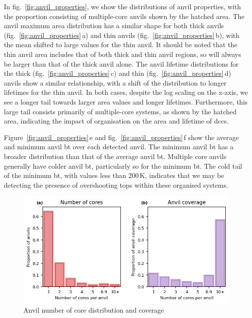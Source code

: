 In fig.~\ref{fig:anvil_properties}, we show the distributions of anvil properties, with the proportion consisting of multiple-core anvils shown by the hatched area.
The anvil maximum area distribution has a similar shape for both thick anvils (fig.~\ref{fig:anvil_properties}\,a) and thin anvils (fig.~\ref{fig:anvil_properties}\,b), with the mean shifted to large values for the thin anvil.
It should be noted that the thin anvil area includes that of both thick and thin anvil regions, so will always be larger than that of the thick anvil alone.
The anvil lifetime distributions for the thick (fig.~\ref{fig:anvil_properties}\,c) and thin (fig.~\ref{fig:anvil_properties}\,d) anvils show a similar relationship, with a shift of the distribution to longer lifetimes for the thin anvil.
In both cases, despite the log scaling on the x-axis, we see a longer tail towards larger area values and longer lifetimes.
Furthermore, this large tail consists primarily of multiple-core systems, as shown by the hatched area, indicating the impact of organisation on the area and lifetime of \acrshort{dcc}s.

Figure~\ref{fig:anvil_properties}\,e and fig.~\ref{fig:anvil_properties}\,f show the average and minimum anvil \acrshort{bt} over each detected anvil.
The minimum anvil \acrshort{bt} has a broader distribution than that of the average anvil \acrshort{bt}.
Multiple core anvils generally have colder anvil \acrshort{bt}, particularly so for the minimum \acrshort{bt}.
The cold tail of the minimum \acrshort{bt}, with values less than 200\,\unit{K}, indicates that we may be detecting the presence of overshooting tops within these organised systems.

\begin{figure}[tp]
    \centering
    \includegraphics[width=\textwidth]{figures/ch2_19.png}
    \caption{Anvil number of core distribution and coverage}
    \label{fig:anvil_cores_and_coverage}
\end{figure}

